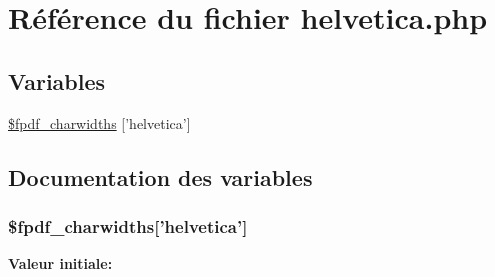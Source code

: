 \hypertarget{helvetica_8php}{
\section{R\'{e}f\'{e}rence du fichier helvetica.php}
\label{helvetica_8php}
}
\subsection*{Variables}
\begin{CompactItemize}
\item 
\hyperlink{helvetica_8php_a0}{\$fpdf\_\-charwidths} \mbox{[}'helvetica'\mbox{]}
\end{CompactItemize}


\subsection{Documentation des variables}
\hypertarget{helvetica_8php_a0}{
\subsubsection[\$fpdf\_\-charwidths]{\setlength{\rightskip}{0pt plus 5cm}\$fpdf\_\-charwidths\mbox{[}'helvetica'\mbox{]}}}
\label{helvetica_8php_a0}


{\bf Valeur initiale:}

